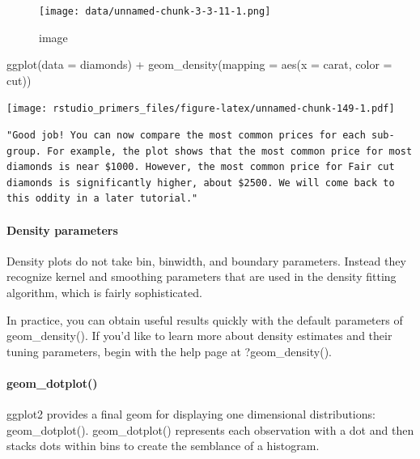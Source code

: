 \documentclass[
]{article}
\newenvironment{Shaded}{\begin{snugshade}}{\end{snugshade}}
\newcommand{\AttributeTok}[1]{\textcolor[rgb]{0.77,0.63,0.00}{#1}}
\newcommand{\FunctionTok}[1]{\textcolor[rgb]{0.00,0.00,0.00}{#1}}
\newcommand{\NormalTok}[1]{#1}
\newcommand{\SpecialCharTok}[1]{\textcolor[rgb]{0.00,0.00,0.00}{#1}}
\begin{document}
\begin{figure}
\centering
\texttt{[image: data/unnamed-chunk-3-3-11-1.png]}
\caption{image}
\end{figure}

\begin{Shaded}
\begin{Highlighting}[]
\FunctionTok{ggplot}\NormalTok{(}\AttributeTok{data =}\NormalTok{ diamonds) }\SpecialCharTok{+}
  \FunctionTok{geom\_density}\NormalTok{(}\AttributeTok{mapping =} \FunctionTok{aes}\NormalTok{(}\AttributeTok{x =}\NormalTok{ carat, }\AttributeTok{color =}\NormalTok{ cut))}
\end{Highlighting}
\end{Shaded}

\texttt{[image: rstudio\_primers\_files/figure-latex/unnamed-chunk-149-1.pdf]}

\begin{verbatim}
"Good job! You can now compare the most common prices for each sub-group. For example, the plot shows that the most common price for most diamonds is near $1000. However, the most common price for Fair cut diamonds is significantly higher, about $2500. We will come back to this oddity in a later tutorial."
\end{verbatim}

\hypertarget{density-parameters}{%
\paragraph{Density parameters}\label{density-parameters}}

Density plots do not take bin, binwidth, and boundary parameters.
Instead they recognize kernel and smoothing parameters that are used in
the density fitting algorithm, which is fairly sophisticated.

In practice, you can obtain useful results quickly with the default
parameters of geom\_density(). If you'd like to learn more about density
estimates and their tuning parameters, begin with the help page at
?geom\_density().

\hypertarget{geom_dotplot}{%
\paragraph{geom\_dotplot()}\label{geom_dotplot}}

ggplot2 provides a final geom for displaying one dimensional
distributions: geom\_dotplot(). geom\_dotplot() represents each
observation with a dot and then stacks dots within bins to create the
semblance of a histogram.
\end{document}
